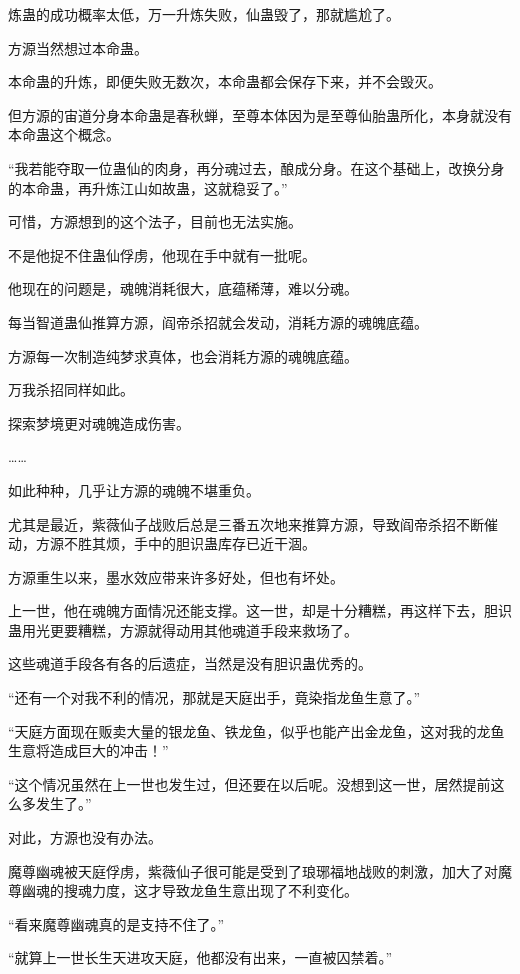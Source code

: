 \begin{this_body}
炼蛊的成功概率太低，万一升炼失败，仙蛊毁了，那就尴尬了。

方源当然想过本命蛊。

本命蛊的升炼，即便失败无数次，本命蛊都会保存下来，并不会毁灭。

但方源的宙道分身本命蛊是春秋蝉，至尊本体因为是至尊仙胎蛊所化，本身就没有本命蛊这个概念。

“我若能夺取一位蛊仙的肉身，再分魂过去，酿成分身。在这个基础上，改换分身的本命蛊，再升炼江山如故蛊，这就稳妥了。”

可惜，方源想到的这个法子，目前也无法实施。

不是他捉不住蛊仙俘虏，他现在手中就有一批呢。

他现在的问题是，魂魄消耗很大，底蕴稀薄，难以分魂。

每当智道蛊仙推算方源，阎帝杀招就会发动，消耗方源的魂魄底蕴。

方源每一次制造纯梦求真体，也会消耗方源的魂魄底蕴。

万我杀招同样如此。

探索梦境更对魂魄造成伤害。

……

如此种种，几乎让方源的魂魄不堪重负。

尤其是最近，紫薇仙子战败后总是三番五次地来推算方源，导致阎帝杀招不断催动，方源不胜其烦，手中的胆识蛊库存已近干涸。

方源重生以来，墨水效应带来许多好处，但也有坏处。

上一世，他在魂魄方面情况还能支撑。这一世，却是十分糟糕，再这样下去，胆识蛊用光更要糟糕，方源就得动用其他魂道手段来救场了。

这些魂道手段各有各的后遗症，当然是没有胆识蛊优秀的。

“还有一个对我不利的情况，那就是天庭出手，竟染指龙鱼生意了。”

“天庭方面现在贩卖大量的银龙鱼、铁龙鱼，似乎也能产出金龙鱼，这对我的龙鱼生意将造成巨大的冲击！”

“这个情况虽然在上一世也发生过，但还要在以后呢。没想到这一世，居然提前这么多发生了。”

对此，方源也没有办法。

魔尊幽魂被天庭俘虏，紫薇仙子很可能是受到了琅琊福地战败的刺激，加大了对魔尊幽魂的搜魂力度，这才导致龙鱼生意出现了不利变化。

“看来魔尊幽魂真的是支持不住了。”

“就算上一世长生天进攻天庭，他都没有出来，一直被囚禁着。”


\end{this_body}
